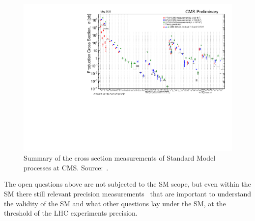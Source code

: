 \begin{figure}
  \centering
  \includegraphics[width=\textwidth]{figures_and_tables/theory/cms_sm_xsec.pdf}
  \caption{Summary of the cross section measurements of Standard Model processes at CMS. Source:~\cite{cms_sm_xsec_summary}.}
  \label{cms_sm_xsec}
\end{figure}

The open questions above are not subjected to the SM scope, but even within the SM there still relevant precision measurements~\cite{sm_global_fit} that are important to understand the validity of the SM and what other questions lay under the SM, at the threshold of the LHC experiments precision.

\clearpage 